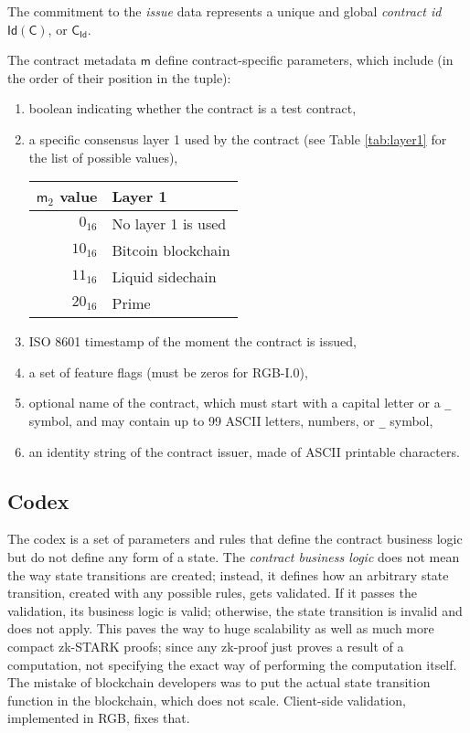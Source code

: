 \documentclass[9pt,oneside]{amsart}
\newenvironment{coltable}
  {\par\bigskip\noindent\minipage{\columnwidth}\centering}
  {\endminipage\par\bigskip}
\begin{document}
\begin{multicols}{2}

The commitment to the \emph{issue} data represents a unique and global \emph{contract id}
$\mathsf{Id}(\mathsf{C})$, or $\mathsf{C_{Id}}$.

The contract metadata $\mathsf{m}$ define contract-specific parameters, which include
(in the order of their position in the tuple):

\begin{enumerate}
\item boolean indicating whether the contract is a test contract,
\item a specific consensus layer 1 used by the contract
  (see Table \ref{tab:layer1} for the list of possible values),

\begin{coltable}
\label{tab:layer1}
\begin{tabular}{r l}
\toprule
$\mathsf{m}_2$ value & Layer 1 \\
\midrule
$0_{16}$ & No layer 1 is used \\
$10_{16}$ & Bitcoin blockchain \cite{Bitcoin} \\
$11_{16}$ & Liquid sidechain \cite{Liquid} \\
$20_{16}$ & Prime \cite{Prime} \\
\bottomrule
\end{tabular}
\end{coltable}

\item ISO 8601 timestamp of the moment the contract is issued,
\item a set of feature flags (must be zeros for RGB-I.0),
\item optional name of the contract, which must start with a capital letter or a \texttt{\_} symbol,
  and may contain up to 99 ASCII letters, numbers, or \texttt{\_} symbol,
\item an identity string of the contract issuer, made of ASCII printable characters.
\end{enumerate}

\subsection{Codex}\label{Codex}

The codex is a set of parameters and rules that define the contract business logic
but do not define any form of a state. The \emph{contract business logic} does not mean
the way state transitions are created; instead, it defines how an arbitrary
state transition, created with any possible rules, gets validated. If it passes the validation,
its business logic is valid; otherwise, the state transition is invalid and does not apply.
This paves the way to huge scalability as well as much more compact zk-STARK proofs;
since any zk-proof just proves a result of a computation,
not specifying the exact way of performing the computation itself.
The mistake of blockchain developers was to put the actual state transition function in
the blockchain, which does not scale. Client-side validation, implemented in RGB, fixes that.


\end{multicols}
\end{document}
